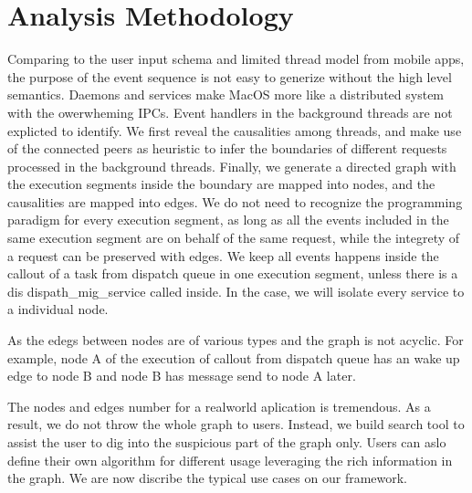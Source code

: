 \section{Analysis Methodology}
Comparing to the user input schema and limited thread model from mobile apps, the purpose of the event sequence is not easy to generize without the high level semantics.
Daemons and services make MacOS more like a distributed system with the owerwheming IPCs.
Event handlers in the background threads are not explicted to identify.
We first reveal the causalities among threads, and make use of the connected peers as heuristic to infer the boundaries of different requests processed in the background threads.
Finally, we generate a directed graph with the execution segments inside the boundary are mapped into nodes, and the causalities are mapped into edges.
We do not need to recognize the programming paradigm for every execution segment, as long as all the events included in the same execution segment are on behalf of the same request, while the integrety of a request can be preserved with edges.
We keep all events happens inside the callout of a task from dispatch queue in one execution segment, unless there is a dis dispath\_mig\_service called inside.
In the case, we will isolate every service to a individual node.

As the edegs between nodes are of various types and the graph is not acyclic.
For example, node A of the execution of callout from dispatch queue has an wake up edge to node B and node B has message send to node A later. 

The nodes and edges number for a realworld aplication is tremendous.
As a result, we do not throw the whole graph to users.
Instead, we build search tool to assist the user to dig into the suspicious part of the graph only.
Users can aslo define their own algorithm for different usage leveraging the rich information in the graph.
We are now discribe the typical use cases on our framework.

